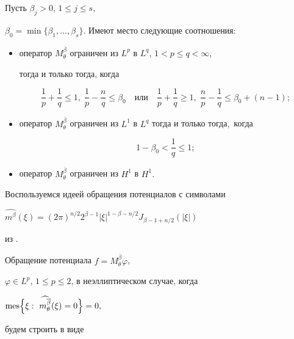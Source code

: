 \begin{theorem}[2~{\rm \cite{b100}}] Пусть $\beta_j>0$, $1\leq j\leq s${\rm ,}

$\beta_0=\min\{\beta_1,\ldots,\beta_s\}$. Имеют место следующие соотношения{\rm :}

\begin{itemize}

\item[\rm  1)] оператор $M_{\theta}^{\overline{\beta}}$ ограничен из $L^p$ в $L^q${\rm ,} $1<p\leq q<\infty${\rm ,}

 тогда и только тогда{\rm ,} когда

$$\frac1p+\frac1q\leq1, \; \frac{1}p-\frac{n}q\leq{\beta_0}\quad\mbox{или}\quad

\frac1p+\frac1q\geq1, \; \frac{n}p-\frac1q\leq{\beta_0+(n-1)};$$

\item[\rm 2)] оператор $M_{\theta}^{\overline{\beta}}$ ограничен из $L^1$ в $L^q$ тогда и только тогда$,$ когда

$${1-\beta_0}<\frac 1 q\leq1;$$

\item[\rm 3)] оператор $M_{\theta}^{\overline{\beta}}$ ограничен из $H^1$ в $H^1.$

\end{itemize}

\label{teor:2}

\end{theorem}



\smallskip




Воспользуемся идеей обращения потенциалов с символами

$\widehat{m^\beta}(\xi)=

(2\pi)^{n/2}2^{\beta-1}|\xi|^{1-\beta-n/2}J_{\beta-1+n/2}(|\xi|)$

из \cite{b5}.



Обращение потенциала $f=M_{\theta}^{\overline{\beta}}\varphi$,

$\varphi\in L^p$, $1\leq p\leq 2$, в неэллиптическом случае, когда

$

 {\mathrm { mes}} \Bigl\{\xi:\ \widehat{m_{\theta}^{\overline{\beta}}}(\xi)=0\Bigr\}=0,

$

 будем строить в виде

